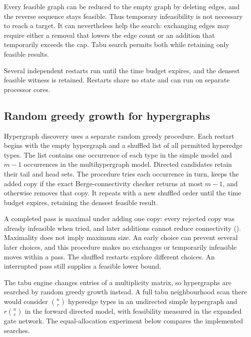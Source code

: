 Every feasible graph can be reduced to the empty graph by deleting edges, and the reverse sequence stays feasible. Thus temporary infeasibility is not necessary to reach a target. It can nevertheless help the search: exchanging edges may require either a removal that lowers the edge count or an addition that temporarily exceeds the cap. Tabu search permits both while retaining only feasible results.

Several independent restarts run until the time budget expires, and the densest feasible witness is retained. Restarts share no state and can run on separate processor cores.

\subsection{Random greedy growth for hypergraphs}

Hypergraph discovery uses a separate random greedy procedure. Each restart
begins with the empty hypergraph and a shuffled list of all permitted hyperedge
types. The list contains one occurrence of each type in the simple model and
$m-1$ occurrences in the multihypergraph model. Directed candidates retain
their tail and head sets. The procedure tries each occurrence in turn, keeps
the added copy if the exact Berge-connectivity checker returns at most $m-1$,
and otherwise removes that copy. It repeats with a new shuffled order until
the time budget expires, retaining the densest feasible result.

A completed pass is maximal under adding one copy: every rejected copy was
already infeasible when tried, and later additions cannot reduce connectivity
(). Maximality does not imply maximum size. An early choice
can prevent several later choices, and this procedure makes no exchanges or
temporarily infeasible moves within a pass. The shuffled restarts explore
different choices. An interrupted pass still supplies a feasible lower bound.

The tabu engine changes entries of a multiplicity matrix, so hypergraphs are
searched by random greedy growth instead. A full tabu neighbourhood scan there
would consider $\binom{n}{r}$ hyperedge types in an undirected simple
hypergraph and $r\binom{n}{r}$ in the forward directed model, with feasibility
measured in the expanded gate network. The equal-allocation experiment below
compares the implemented searches.

